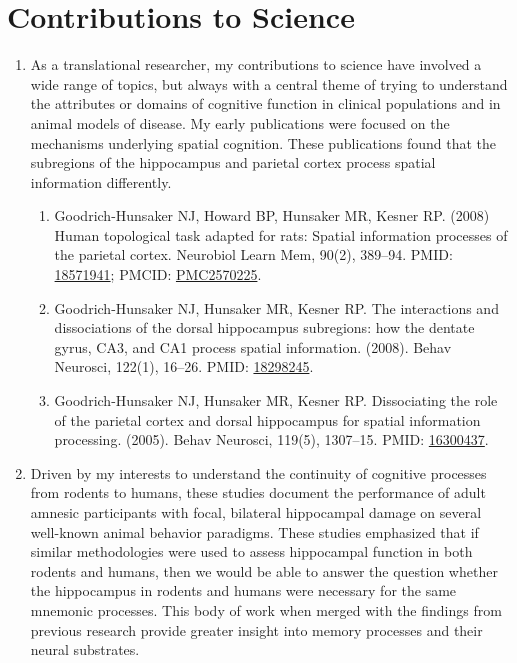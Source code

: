 \documentclass{nihbiosketch}
\begin{document}

\section{Contributions to Science}

\begin{enumerate}
	
	\item As a translational researcher, my contributions to science have involved a wide range of topics, but always with a central theme of trying to understand the attributes or domains of cognitive function in clinical populations and in animal models of disease. My early publications were focused on the mechanisms underlying spatial cognition. These publications found that the subregions of the hippocampus and parietal cortex process spatial information differently. 
	      
	      \begin{enumerate}
	      	
	      	\item Goodrich-Hunsaker NJ, Howard BP, Hunsaker MR, Kesner RP. (2008) Human topological task adapted for rats: Spatial information processes of the parietal cortex. Neurobiol Learn Mem, 90(2), 389--94. PMID: \href{https:/pubmed.ncbi.nlm.nih.gov/18571941}{18571941}; PMCID: \href{https://www.ncbi.nlm.nih.gov/pmc/articles/PMC2570225}{PMC2570225}.
	      	      
	      	\item Goodrich-Hunsaker NJ, Hunsaker MR, Kesner RP. The interactions and dissociations of the dorsal hippocampus subregions: how the dentate gyrus, CA3, and CA1 process spatial information. (2008). Behav Neurosci, 122(1), 16--26. PMID: \href{https:/pubmed.ncbi.nlm.nih.gov/18298245}{18298245}.
	      	      
	      	\item Goodrich-Hunsaker NJ, Hunsaker MR, Kesner RP. Dissociating the role of the parietal cortex and dorsal hippocampus for spatial information processing. (2005). Behav Neurosci, 119(5), 1307--15. PMID: \href{https:/pubmed.ncbi.nlm.nih.gov/16300437}{16300437}.
	      	      
	      \end{enumerate}
	      
	      
	\item Driven by my interests to understand the continuity of cognitive processes from rodents to humans, these studies document the performance of adult amnesic participants with focal, bilateral hippocampal damage on several well-known animal behavior paradigms. These studies emphasized that if similar methodologies were used to assess hippocampal function in both rodents and humans, then we would be able to answer the question whether the hippocampus in rodents and humans were necessary for the same mnemonic processes. This body of work when merged with the findings from previous research provide greater insight into memory processes and their neural substrates.    
	      

\end{enumerate}
\end{document}
